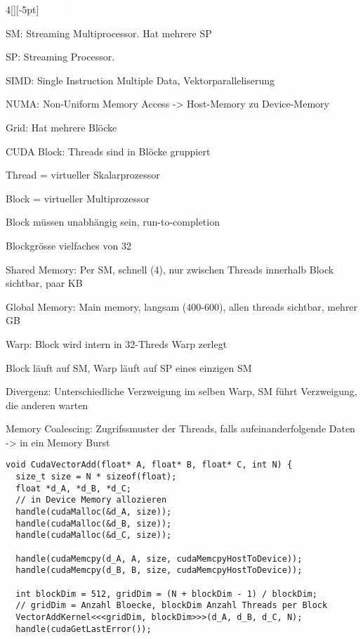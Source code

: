 \documentclass[%
	pdftex,%
	a4paper,%
	landscape,%
	ngerman,
	oneside,%
	6pt,%
	halfparskip,%
]{scrbook}
\newenvironment{mainbox}{%
  \def\FrameCommand{\fboxrule 1px \fcolorbox{black}{spec_blue}}%
  \MakeFramed {\advance\hsize-\width \FrameRestore}}%
 {\endMakeFramed}
\newcommand{\maintopic}[1]{\setcounter{subtopicenum}{0}\setcounter{subsubtopicenum}{0}\vspace{-4px}\begin{mainbox}\textcolor{white}{\textbf{\large{\stepcounter{maintopicenum}\Roman{maintopicenum}. #1}}}\end{mainbox}\vspace{-4px}}
\newenvironment{tight-itemize}
{ \begin{itemize}
    \setlength{\itemsep}{0px}
    \setlength{\parskip}{0px}
    \setlength{\parsep}{0px}  }
{ \end{itemize}                  }
\begin{document}
\begin{multicols}{4}[][-5pt]
\maintopic{GPU Parallelisierung}
\begin{tight-itemize}
	\item{SM: Streaming Multiprocessor. Hat mehrere SP}
	\item{SP: Streaming Processor. }
  	\item{SIMD: Single Instruction Multiple Data, Vektorparalleliserung}
    \item{NUMA: Non-Uniform Memory Access -> Host-Memory zu Device-Memory}
    \item{Grid: Hat mehrere Blöcke}
    \item{CUDA Block: Threads sind in Blöcke gruppiert }
    \item{Thread = virtueller Skalarprozessor}
    \item{Block = virtueller Multiprozessor}
    \item{Block müssen unabhängig sein, run-to-completion}
    \item{Blockgrösse vielfaches von 32}
    \item{Shared Memory: Per SM, schnell (4), nur zwischen Threads innerhalb Block sichtbar, paar KB }
    \item{Global Memory: Main memory, langsam (400-600), allen threads sichtbar, mehrer GB}
    \item{Warp: Block wird intern in 32-Threds Warp zerlegt}
    \item{Block läuft auf SM, Warp läuft auf SP eines einzigen SM}
    \item{Divergenz: Unterschiedliche Verzweigung im selben Warp, SM führt Verzweigung, die anderen warten}
    \item{Memory Coalescing: Zugrifssmuster der Threads, falls aufeinanderfolgende Daten -> in ein Memory Burst}
\end{tight-itemize}

\begin{lstlisting}
void CudaVectorAdd(float* A, float* B, float* C, int N) {
  size_t size = N * sizeof(float);
  float *d_A, *d_B, *d_C;
  // in Device Memory allozieren
  handle(cudaMalloc(&d_A, size)); 
  handle(cudaMalloc(&d_B, size));
  handle(cudaMalloc(&d_C, size));
  
  handle(cudaMemcpy(d_A, A, size, cudaMemcpyHostToDevice));
  handle(cudaMemcpy(d_B, B, size, cudaMemcpyHostToDevice));
  
  int blockDim = 512, gridDim = (N + blockDim - 1) / blockDim;
  // gridDim = Anzahl Bloecke, blockDim Anzahl Threads per Block
  VectorAddKernel<<<gridDim, blockDim>>>(d_A, d_B, d_C, N);
  handle(cudaGetLastError());
  

\end{lstlisting}
\end{multicols}
\end{document}
